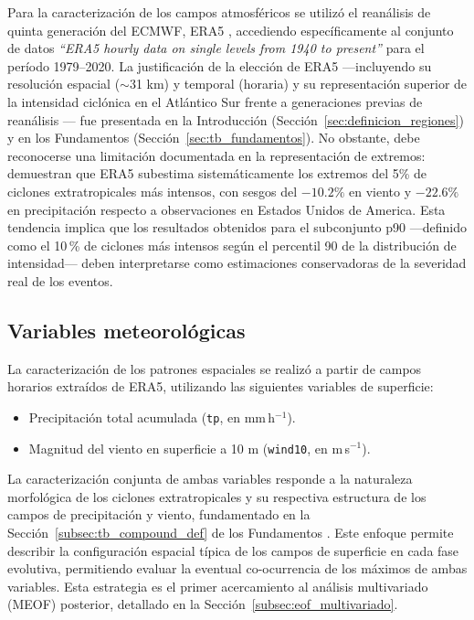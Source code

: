 Para la caracterización de los campos atmosféricos se utilizó el reanálisis de quinta generación del ECMWF, ERA5 \citep{hersbach2020era5}, accediendo específicamente al conjunto de datos \textit{``ERA5 hourly data on single levels from 1940 to present''} \citep{hersbach_era5_2023b} para el período 1979--2020. La justificación de la elección de ERA5 ---incluyendo su resolución espacial ($\sim$31 km) y temporal (horaria) y su representación superior de la intensidad ciclónica en el Atlántico Sur frente a generaciones previas de reanálisis \citep{gramcianinov2020analysis}--- fue presentada en la Introducción (Sección~\ref{sec:definicion_regiones}) y en los Fundamentos (Sección~\ref{sec:tb_fundamentos}). No obstante, debe reconocerse una limitación documentada en la representación de extremos: \citet{chen2024evaluation} demuestran que ERA5 subestima sistemáticamente los extremos del 5\% de ciclones extratropicales más intensos, con sesgos del $-10.2\%$ en viento y $-22.6\%$ en precipitación respecto a observaciones en Estados Unidos de America. Esta tendencia implica que los resultados obtenidos para el subconjunto p90 ---definido como el 10\,\% de ciclones más intensos según el percentil 90 de la distribución de intensidad--- deben interpretarse como estimaciones conservadoras de la severidad real de los eventos.

\subsection{Variables meteorológicas}\label{subsec:variables}

La caracterización de los patrones espaciales se realizó a partir de campos horarios extraídos de ERA5, utilizando las siguientes variables de superficie:

\begin{itemize}
    \item Precipitación total acumulada (\texttt{tp}, en mm\,h$^{-1}$).
    \item Magnitud del viento en superficie a 10 m (\texttt{wind10}, en m\,s$^{-1}$).
\end{itemize}

La caracterización conjunta de ambas variables responde a la naturaleza morfológica de los ciclones extratropicales y su respectiva estructura de los campos de precipitación y viento, fundamentado en la Sección~\ref{subsec:tb_compound_def} de los Fundamentos . Este enfoque permite describir la configuración espacial típica de los campos de superficie en cada fase evolutiva, permitiendo evaluar la eventual co-ocurrencia de los máximos de ambas variables. 
Esta estrategia es el primer acercamiento al análisis multivariado (MEOF) posterior, detallado en la Sección~\ref{subsec:eof_multivariado}.

